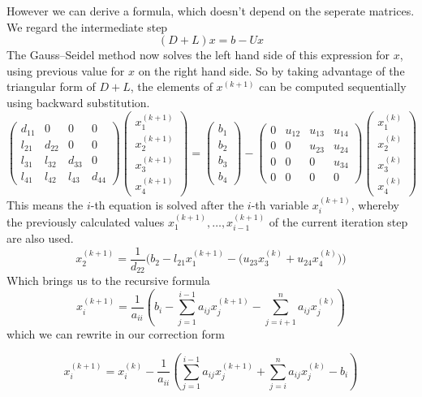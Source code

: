 However we can derive a formula, which doesn't depend on the seperate matrices.
We regard the intermediate step
\[(D + L)x = b - Ux\]
The Gauss–Seidel method now solves the left hand side of this expression for \(x\), using previous value for \(x\) on the right hand side.
So by taking advantage of the triangular form of \(D+L\), the elements of \(x^{(k+1)}\) can be computed sequentially using backward substitution.
\[
   \begin{pmatrix}
      d_{11}  & 0     & 0      & 0 \\
      l_{21} & d_{22} & 0      & 0 \\
      l_{31} & l_{32} & d_{33} & 0 \\
      l_{41} & l_{42} & l_{43} & d_{44}
   \end{pmatrix} \begin{pmatrix} x_1^{(k+1)}\\x_2^{(k+1)}\\x_3^{(k+1)}\\x_4^{(k+1)}\end{pmatrix} =
   \begin{pmatrix}b_1\\b_2\\b_3\\b_4\end{pmatrix} -
   \begin{pmatrix}
      0 & u_{12} & u_{13} & u_{14} \\
      0 & 0      & u_{23} & u_{24} \\
      0 & 0      & 0      & u_{34} \\
      0 & 0      & 0      & 0
   \end{pmatrix} \begin{pmatrix}x_1^{(k)}\\x_2^{(k)}\\x_3^{(k)}\\x_4^{(k)}\end{pmatrix}
\]
This means the \(i\)-th equation is solved after the \(i\)-th variable \(x_i^{(k+1)}\), whereby the previously calculated values \(x_1^{(k+1)}, \ldots, x_{i-1}^{(k+1)}\) of the current iteration step are also used.
\[x_2^{(k+1)} = \frac{1}{d_{22}}\bigg(b_2 - l_{21}x_1^{(k+1)} - \Big(u_{23}x_3^{(k)} + u_{24}x_4^{(k)}\Big)\bigg)\]
Which brings us to the recursive formula
\[x_i^{(k+1)} = \frac{1}{a_{ii}}\left(b_i - \sum_{j=1}^{i-1}a_{ij}x_j^{(k+1)} - \sum_{j=i+1}^n a_{ij}x_j^{(k)}\right)\]
which we can rewrite in our correction form
\begin{definition}
   \[x_i^{(k+1)} = x_i^{(k)} - \frac{1}{a_{ii}} \left(\sum_{j=1}^{i-1} a_{ij} x_j^{(k+1)} + \sum_{j=i}^n a_{ij} x_j^{(k)} - b_i\right)\]
\end{definition}

